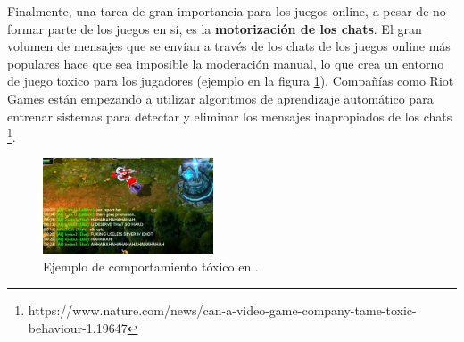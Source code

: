 Finalmente, una tarea de gran importancia para los juegos online, a pesar de no formar parte de los juegos en sí, es la \textbf{motorización de los chats}. El gran volumen de mensajes que se envían a través de los chats de los juegos online más populares hace que sea imposible la moderación manual, lo que crea un entorno de juego toxico para los jugadores (ejemplo en la figura \ref{lol-toxic-capture}). Compañías como Riot Games están empezando a utilizar algoritmos de aprendizaje automático para entrenar sistemas para detectar y eliminar los mensajes inapropiados de los chats \footnote{https://www.nature.com/news/can-a-video-game-company-tame-toxic-behaviour-1.19647}.

\begin{figure}[h]
	\includegraphics[width=0.45\textwidth]{images/estadodelarte/ai/lol-toxic-capture}
	\centering
	\caption{Ejemplo de comportamiento tóxico en .}
	\label{lol-toxic-capture}
\end{figure}
